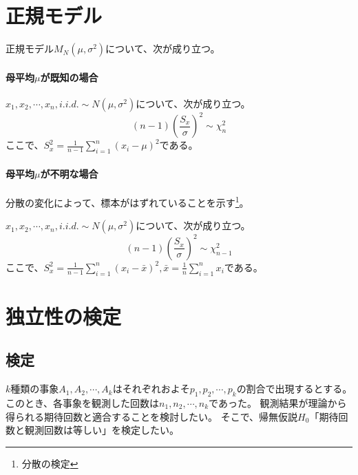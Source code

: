 \section{正規モデル}
正規モデル$M_N(\mu,\sigma^2)$について、次が成り立つ。
\paragraph{母平均$\mu$が既知の場合}
\begin{theo}\label{normal_sigma_chi2}
    $x_1,x_2,\cdots,x_n,i.i.d. \sim N(\mu,\sigma^2)$について、次が成り立つ。
    \begin{equation*}
     (n-1)\left(\frac{S_x}{\sigma} \right)^2 \sim \chi^2_{n}
    \end{equation*}
    ここで、$S^2_x=\frac{1}{n-1}\sum_{i=1}^n(x_i-\mu)^2$である。
\end{theo}

\paragraph{母平均$\mu$が不明な場合}
分散の変化によって、標本がはずれていることを示す\footnote{分散の検定}。
\begin{theo}\label{normal_sigma_chi2}
    $x_1,x_2,\cdots,x_n,i.i.d. \sim N(\mu,\sigma^2)$について、次が成り立つ。
    \begin{equation*}
        (n-1)\left(\frac{S_x}{\sigma} \right)^2 \sim \chi^2_{n-1}
    \end{equation*}
    ここで、$S^2_x=\frac{1}{n-1}\sum_{i=1}^n(x_i-\bar{x})^2,\bar{x}=\frac{1}{n}\sum_{i=1}^n x_i$である。
\end{theo}


\section{独立性の検定}

\subsection{検定}
$k$種類の事象$A_1,A_2,\cdots,A_k$はそれぞれおよそ$p_1,p_2,\cdots,p_k$の割合で出現するとする。このとき、各事象を観測した回数は$n_1,n_2,\cdots,n_k$であった。
観測結果が理論から得られる期待回数と適合することを検討したい。
そこで、帰無仮説$H_0$「期待回数と観測回数は等しい」を検定したい。

